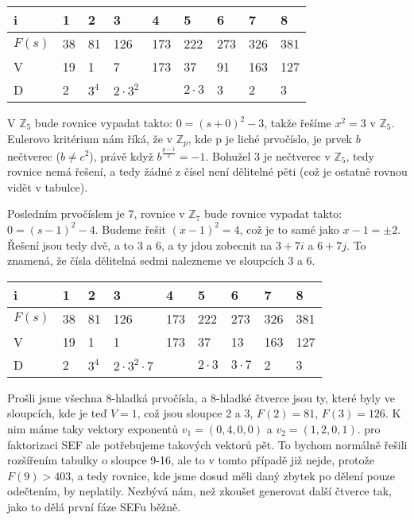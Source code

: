\documentclass[10pt,a4paper]{article}
\begin{document}
\begin{exercise}
\begin{center}
\begin{tabular}{|p{1cm}|p{1cm}|p{1cm}|p{1cm}|p{1cm}|p{1cm}|p{1cm}|p{1cm}|p{1cm}|}
\hline
i & 1 & \textbf{2} &\textbf{3} & 4 & \textbf{5} & \textbf{6} & 7 & \textbf{8}\\
\hline
\hline
$F(s)$ & 38 & 81 & 126 & 173 & 222 & 273 & 326 & 381\\
\hline
V & 19 & 1 & 7 & 173 & 37 & 91 & 163 & 127\\
\hline
D & 2  & $3^4$ & $2\cdot 3^2$  &         & $2\cdot 3$   &   3   &  2    &  3 \\
\hline
\end{tabular}
\end{center}

V $\mathbb{Z}_5$ bude rovnice vypadat takto: $0 = (s + 0)^2 - 3$, takže řešíme
$x^2 = 3$ v $\mathbb{Z}_5$.  Eulerovo kritérium nám říká, že v $\mathbb{Z}_p$,
kde p je liché prvočíslo, je prvek $b$ nečtverec ($b \neq c^2$), právě když
$b^{\frac{p-1}{2}} = -1$. Bohužel 3 je nečtverec v $\mathbb{Z}_5$, tedy rovnice
nemá řešení, a tedy žádné z čísel není dělitelné pěti (což je ostatně rovnou
vidět v tabulce).

Posledním prvočíslem je 7, rovnice v $\mathbb{Z}_7$ bude rovnice vypadat takto:
$0 = (s - 1)^2 - 4$. Budeme řešit $(x-1)^2 = 4$, což je to samé jako $x-1 = \pm
2$. Řešení jsou tedy dvě, a to 3 a 6, a ty jdou zobecnit na $3 + 7i$ a $6 + 7j$.
To znamená, že čísla dělitelná sedmi nalezneme ve sloupcích 3 a 6.

\begin{center}
\begin{tabular}{|p{1cm}|p{1cm}|p{1cm}|p{1cm}|p{1cm}|p{1cm}|p{1cm}|p{1cm}|p{1cm}|}
\hline
i & 1 & 2 &\textbf{3} & 4 & 5 & \textbf{6} & 7 & 8\\
\hline
\hline
$F(s)$ & 38 & 81 & 126 & 173 & 222 & 273 & 326 & 381\\
\hline
V & 19 & 1 & 1 & 173 & 37 & 13 & 163 & 127\\
\hline
D & 2  & $3^4$ & $2\cdot 3^2 \cdot 7$  &         & $2\cdot 3$   &   $3 \cdot 7$
&  2    &  3 \\
\hline
\end{tabular}
\end{center}

Prošli jsme všechna 8-hladká prvočísla, a 8-hladké čtverce jsou ty, které byly
ve sloupcích, kde je teď $V = 1$, což jsou sloupce 2 a 3, $F(2) = 81$, $F(3) =
126$. K nim máme taky vektory exponentů $v_1 = (0, 4, 0, 0)$ a $v_2 = (1, 2, 0,
1)$. pro faktorizaci SEF ale potřebujeme takových vektorů pět. To bychom
normálně řešili rozšířením tabulky o sloupce 9-16, ale to v tomto případě již
nejde, protože $F(9) > 403$, a tedy rovnice, kde jsme dosud měli daný zbytek po
dělení pouze odečtením, by neplatily. Nezbývá nám, než zkoušet generovat další
čtverce tak, jako to dělá první fáze SEFu běžně.
\end{exercise}
\end{document}
